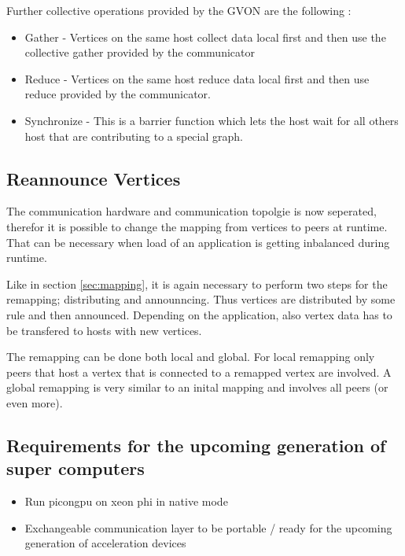 Further collective operations provided by the GVON are the 
following :

\begin{itemize}
\item Gather - Vertices on the same host collect data local first and
  then use the collective gather provided by the communicator
\item Reduce - Vertices on the same host reduce data local first and
  then use reduce provided by the communicator.
\item Synchronize - This is a barrier function which lets the host
  wait for all others host that are contributing to a special graph.
\end{itemize}

\subsection{Reannounce Vertices}
The communication hardware and communication topolgie is now
seperated, therefor it is possible to change the mapping from
vertices to peers at runtime. That can be necessary when load of an
application is getting inbalanced during runtime.

Like in section \ref{sec:mapping}, it is again necessary to perform two steps for the remapping;
distributing and announncing. Thus vertices are distributed by some
rule and then announced. Depending on the application, also 
vertex data has to be transfered to hosts with new vertices.

The remapping can be done both local and global. For local remapping
only peers that host a vertex that is connected to a remapped vertex
are involved. A global remapping is very similar to an inital mapping
and involves all peers (or even more).




\subsection{Requirements for the upcoming generation of super computers}
\begin{itemize}
\item Run picongpu on xeon phi in native mode
\item Exchangeable communication layer to be portable / ready for the
  upcoming generation of acceleration devices
\end{itemize}


